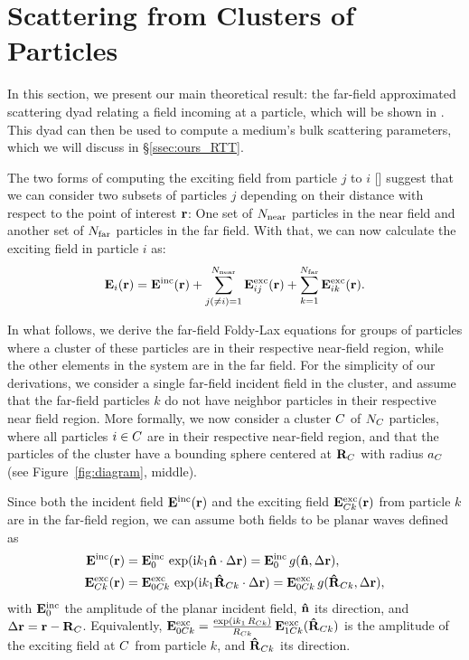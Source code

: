 \section{Scattering from Clusters of Particles}
\label{sec:ours_theory}
%
%
In this section, we present our main theoretical result: the far-field approximated scattering dyad relating a field incoming at a particle, which will be shown in .
This dyad can then be used to compute a medium's bulk scattering parameters, which we will discuss in \S\ref{ssec:ours_RTT}.

The two forms of computing the exciting field from particle $j$ to $i$ [] suggest that we can consider two subsets of particles $j$ depending on their distance with respect to the point of interest $\mathbf{r}$: One set of ${N_{\text{near}}}$ particles in the near field and another set of ${N_{\text{far}}}$ particles in the far field. With that, we can now calculate the exciting field in particle $i$ as:
%
\begin{equation}
    \mathbf{E}_i(\mathbf{r})= \mathbf{E}^\text{inc}(\mathbf{r}) + \sum_{j(\neq i)=1}^{N_{\text{near}}} \mathbf{E}^\text{exc}_{ij}(\mathbf{r}) + \sum_{k=1}^{N_{\text{far}}} \mathbf{E}^\text{exc}_{ik}(\mathbf{r}).
    \label{eq:foldylaxtwo}
\end{equation}

In what follows, we derive the far-field Foldy-Lax equations for groups of particles where a cluster of these particles are in their respective near-field region, while the other elements in the system are in the far field. For the simplicity of our derivations, we consider a single far-field incident field in the cluster, and assume that the far-field particles $k$ do not have neighbor particles in their respective near field region.
%
More formally, we now consider a cluster $C$ of $N_C$ particles, where all particles $i\in C$ are in their respective near-field region, and that the particles of the cluster have a bounding sphere centered at $\mathbf{R}_C$ with radius $a_C$ (see Figure~\ref{fig:diagram}, middle). 

Since both the incident field $\mathbf{E}^\text{inc}(\mathbf{r})$ and the exciting field $\mathbf{E}^\text{exc}_{C k}(\mathbf{r})$ from particle $k$ are in the far-field region, we can assume both fields to be planar waves defined as
%
\begin{align}
    \label{eq:farincfieldcluster}
    \mathbf{E}^\text{inc}(\mathbf{r}) &= \mathbf{E}^\text{inc}_0 \,\exp(\text{i} k_1 \mathbf{\hat{n}} \cdot \Delta \mathbf{r}) = \mathbf{E}^\text{inc}_0\,g(\mathbf{\hat{n}}, \Delta \mathbf{r}) , \\
    \mathbf{E}^\text{exc}_{C k}(\mathbf{r}) &= \mathbf{E}^\text{exc}_{0C k}\,\exp(\text{i} k_1 \mathbf{\hat{R}}_{C k} \cdot \Delta \mathbf{r}) =  \mathbf{E}^\text{exc}_{0C k}\,g(\mathbf{\hat{R}}_{C k}, \Delta \mathbf{r}), 
    \label{eq:farexcfieldcluster} 
\end{align}
%  
with $\mathbf{E}^\text{inc}_0$ the amplitude of the planar incident field, $\mathbf{\hat{n}}$ its direction, and $\Delta \mathbf{r}=\mathbf{r}-\mathbf{R}_C$. Equivalently, $\mathbf{E}^\text{exc}_{0C k}=\frac{\exp(\text{i} k_1 \,R_{C k})}{R_{C k}}\,\mathbf{E}^\text{exc}_{1C k}(\mathbf{\hat{R}}_{C k})$  is the amplitude of the exciting field at $C$ from particle $k$, and $\mathbf{\hat{R}}_{C k}$ its direction. 

